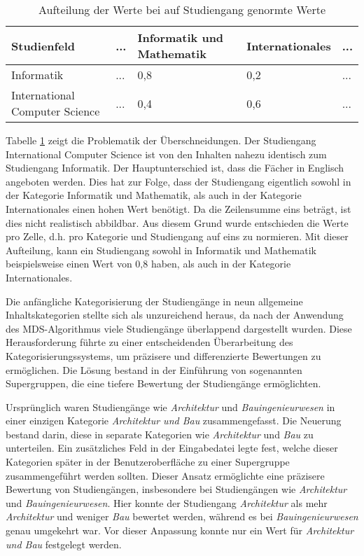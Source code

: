 \begin{table}[!ht]
    \centering
    \begin{tabular}{|l|l|l|l|l|}
    \hline
    \textbf{Studienfeld}           & \textbf{...} & \textbf{Informatik und Mathematik} & \textbf{Internationales} & \textbf{...} \\ \hline
    Informatik                     & ...          & 0,8                                & 0,2                      & ...          \\ \hline
    International Computer Science & ...          & 0,4                                & 0,6                      & ...          \\ \hline
    \end{tabular}

    \caption{Aufteilung der Werte bei auf Studiengang genormte Werte}
    \label{table:norm-values}
\end{table}

Tabelle \ref{table:norm-values} zeigt die Problematik der Überschneidungen. Der
Studiengang International Computer Science ist von den Inhalten nahezu
identisch zum Studiengang Informatik. Der Hauptunterschied ist, dass die Fächer
in Englisch angeboten werden. Dies hat zur Folge, dass der Studiengang
eigentlich sowohl in der Kategorie Informatik und Mathematik, als auch in der
Kategorie Internationales einen hohen Wert benötigt. Da die Zeilensumme eins
beträgt, ist dies nicht realistisch abbildbar. Aus diesem Grund wurde
entschieden die Werte pro Zelle, d.h. pro Kategorie und Studiengang auf eins
zu normieren. Mit dieser Aufteilung, kann ein Studiengang sowohl in Informatik
und Mathematik beispielsweise einen Wert von 0,8 haben, als auch in der
Kategorie Internationales.

Die anfängliche Kategorisierung der Studiengänge in neun allgemeine
Inhaltskategorien stellte sich als unzureichend heraus, da nach der Anwendung
des MDS-Algorithmus viele Studiengänge überlappend dargestellt wurden. Diese
Herausforderung führte zu einer entscheidenden Überarbeitung des
Kategorisierungssystems, um präzisere und differenzierte Bewertungen zu
ermöglichen. Die Lösung bestand in der Einführung von sogenannten Supergruppen,
die eine tiefere Bewertung der Studiengänge ermöglichten.

Ursprünglich waren Studiengänge wie \textit{Architektur} und
\textit{Bauingenieurwesen} in einer einzigen Kategorie
\textit{Architektur und Bau} zusammengefasst. Die Neuerung bestand darin, diese
in separate Kategorien wie \textit{Architektur} und \textit{Bau} zu unterteilen.
Ein zusätzliches Feld in der Eingabedatei legte fest, welche dieser Kategorien
später in der Benutzeroberfläche zu einer Supergruppe zusammengeführt werden
sollten. Dieser Ansatz ermöglichte eine präzisere Bewertung von Studiengängen,
insbesondere bei Studiengängen wie \textit{Architektur} und
\textit{Bauingenieurwesen}. Hier konnte der Studiengang \textit{Architektur} als
mehr \textit{Architektur} und weniger \textit{Bau} bewertet werden, während es
bei \textit{Bauingenieurwesen} genau umgekehrt war. Vor dieser Anpassung konnte
nur ein Wert für \textit{Architektur und Bau} festgelegt werden.

